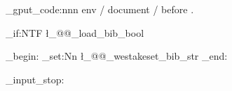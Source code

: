 \hook_gput_code:nnn { env / document / before } { . }
  {
    \bool_if:NTF \l_@@_load_bib_bool
      {
        \DeclareDocumentCommand \printbibliography {}
          {
            \group_begin:
              \dim_set:Nn \bibsep {1pt}
              \linespread{1.85}\selectfont {}
               { \l_@@_westakeset_bib_str }
            \group_end:
          }
      } { \newcommand \printbibliography { \chapter* { 参考文献 } } }
  }

\file_input_stop: